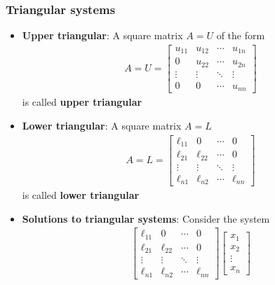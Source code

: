 \documentclass{report}
\begin{document}
    \subsubsection{Triangular systems}
    \begin{itemize}
        \item \textbf{Upper triangular}: A square matrix $A = U$ of the form 
            \begin{align*}
                A = U = \begin{bmatrix}
                    u_{11} & u_{12} & \cdots & u_{1n} \\
                    0 & u_{22} & \cdots & u_{2n} \\
                    \vdots & \vdots & \ddots & \vdots \\
                    0 & 0 & \cdots & u_{nn}
                \end{bmatrix}
            \end{align*}
            is called \textbf{upper triangular}
        \item \textbf{Lower triangular}: A square matrix $A = L$
            \begin{align*}
                A = L = \begin{bmatrix}
                    \ell_{11} & 0 & \cdots & 0 \\
                    \ell_{21} & \ell_{22} & \cdots & 0 \\
                    \vdots & \vdots & \ddots & \vdots \\
                    \ell_{n1} & \ell_{n2} & \cdots & \ell_{nn}
                \end{bmatrix}
            \end{align*}
            is called \textbf{lower triangular}
        \item \textbf{Solutions to triangular systems}: Consider the system
            \begin{align*}
               \begin{bmatrix}
                    \ell_{11} & 0 & \cdots & 0 \\
                    \ell_{21} & \ell_{22} & \cdots & 0 \\
                    \vdots & \vdots & \ddots & \vdots \\
                    \ell_{n1} & \ell_{n2} & \cdots & \ell_{nn}
                \end{bmatrix} \begin{bmatrix}
                    x_{1} \\ x_{2} \\ \vdots \\ x_{n}

\end{bmatrix}
\end{align*}
\end{itemize}
\end{document}
